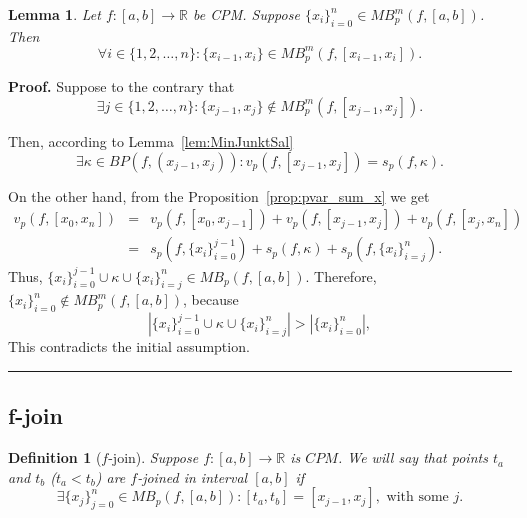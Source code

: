 \documentclass[12pt, a4paper]{article}
\newtheorem{lemma}[theorem]{Lemma}
\newtheorem{definition}[theorem]{Definition}
\newenvironment{proof}[1][Proof]{\noindent \textbf{#1.} }{\  \rule{0.5em}{0.5em}}
\numberwithin{equation}{section}
\begin{document}
\begin{lemma}\label{prop:MaxKapaJunkMax}
  Let $f:[a,b] \rightarrow \mathbb{R}$ be CPM. Suppose $\{x_i\}_{i=0}^n \in MB_{p}^m(f,[a,b])$.
  Then 
  \begin{equation}
    \forall i \in \{1,2,\dots,n\} : \{x_{i-1},x_i\} \in MB_{p}^m(f,[x_{i-1},x_i]). 
  \end{equation}
\end{lemma}
\begin{proof}
  Suppose to the contrary that
  \begin{equation}
    \exists j \in \{1,2,\dots,n\} :\{x_{j-1},x_j\}  \notin MB_{p}^m(f,[x_{j-1},x_j]).
  \end{equation}
  
  Then, according to Lemma~\ref{lem:MinJunktSal} 
  \begin{equation}
    \exists \kappa \in BP(f,(x_{j-1}, x_j)): v_p(f,[x_{j-1}, x_j]) = s_p(f, \kappa).
  \end{equation}
    
  On the other hand, from the Proposition~\ref{prop:pvar_sum_x} we get
  \begin{eqnarray*}
    v_p(f,[x_0, x_n]) &=& v_p(f,[x_0, x_{j-1}]) + v_p(f,[x_{j-1}, x_{j}]) + v_p(f,[x_j, x_n])  \\
                &=& s_p(f,\{x_i\}_{i=0}^{j-1}) + s_p(f, \kappa) +s_p(f,\{x_i\}_{i=j}^{n}).
  \end{eqnarray*}
  Thus,  $\{x_i\}_{i=0}^{j-1} \cup \kappa \cup \{x_i\}_{i=j}^{n} \in MB_{p}(f,[a,b])$.  
  Therefore, $\{x_i\}_{i=0}^n \notin MB_{p}^m(f,[a,b])$, because
  \begin{equation}
  |\{x_i\}_{i=0}^{j-1} \cup \kappa \cup \{x_i\}_{i=j}^{n}| > |\{x_i\}_{i=0}^n|,  
  \end{equation}
  This contradicts the initial assumption.
\end{proof}

\subsection{f-join}

\begin{definition}[$f$-join]\label{def:fjoin}
  Suppose $f:[a,b] \rightarrow \mathbb{R}$ is $CPM$.
  We will say that points $t_a$ and $t_b$ ($t_a<t_b$) are \emph{$f$-joined} in interval $[a,b]$ if 
  \begin{equation}
    \exists \{x_j\}_{j=0}^{n} \in MB_{p}(f,[a,b]): [t_a,t_b]=[x_{j-1},x_j], \text{ with some } j.
  \end{equation}  
\end{definition}
\end{document}
